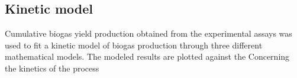 \subsection{Kinetic model}
Cumulative biogas yield production obtained from the experimental assays was used to fit a kinetic model of biogas production through three different mathematical models. The modeled results are plotted against the
Concerning the kinetics of the process